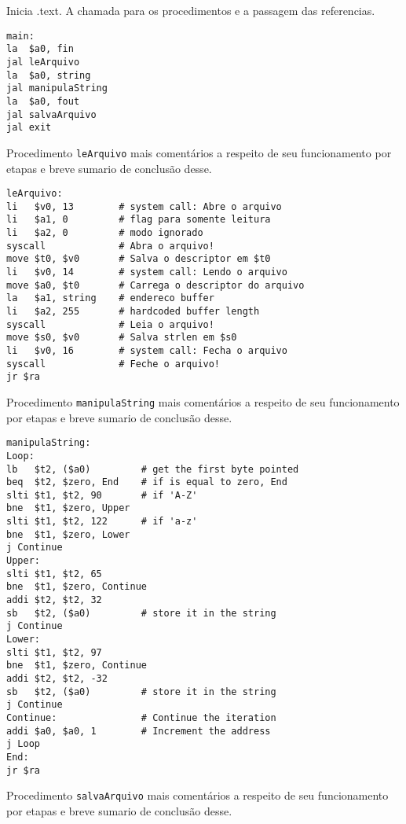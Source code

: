 \documentclass[12pt,a4paper]{article}
\begin{document}
Inicia .text. A chamada para os procedimentos e a passagem das referencias.

\vspace{-0.5cm}
\begin{lstlisting}[caption={main}]
main:
la  $a0, fin
jal leArquivo
la  $a0, string
jal manipulaString
la  $a0, fout
jal salvaArquivo
jal exit
\end{lstlisting}

Procedimento \texttt{leArquivo} mais comentários a respeito de seu funcionamento por etapas e breve sumario de conclusão desse.

\vspace{-0.5cm}
\begin{lstlisting}[caption={leArquivo}]
leArquivo:
li   $v0, 13        # system call: Abre o arquivo
li   $a1, 0         # flag para somente leitura
li   $a2, 0         # modo ignorado
syscall             # Abra o arquivo!
move $t0, $v0       # Salva o descriptor em $t0
li   $v0, 14        # system call: Lendo o arquivo
move $a0, $t0       # Carrega o descriptor do arquivo
la   $a1, string    # endereco buffer
li   $a2, 255       # hardcoded buffer length
syscall             # Leia o arquivo!
move $s0, $v0       # Salva strlen em $s0
li   $v0, 16        # system call: Fecha o arquivo
syscall             # Feche o arquivo!
jr $ra
\end{lstlisting}


Procedimento \texttt{manipulaString} mais comentários a respeito de seu funcionamento por etapas e breve sumario de conclusão desse.

\lipsum[1]

\vspace{-0.5cm}
\begin{lstlisting}[caption={manipulaString}]
manipulaString:
Loop:  
lb   $t2, ($a0)         # get the first byte pointed
beq  $t2, $zero, End    # if is equal to zero, End
slti $t1, $t2, 90       # if 'A-Z'
bne  $t1, $zero, Upper
slti $t1, $t2, 122      # if 'a-z'
bne  $t1, $zero, Lower
j Continue
Upper:
slti $t1, $t2, 65
bne  $t1, $zero, Continue
addi $t2, $t2, 32  
sb   $t2, ($a0)         # store it in the string
j Continue
Lower:
slti $t1, $t2, 97
bne  $t1, $zero, Continue
addi $t2, $t2, -32  
sb   $t2, ($a0)         # store it in the string
j Continue
Continue:               # Continue the iteration
addi $a0, $a0, 1        # Increment the address
j Loop
End:    
jr $ra
\end{lstlisting}

Procedimento \texttt{salvaArquivo} mais comentários a respeito de seu funcionamento por etapas e breve sumario de conclusão desse.
\end{document}
